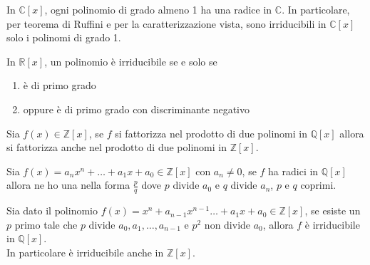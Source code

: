\begin{teorema}
	In $\mathbb{C}[x]$, ogni polinomio di grado almeno 1 ha una radice in $\mathbb{C}$. In particolare, per teorema di Ruffini e per la caratterizzazione vista, sono irriducibili in $\mathbb{C}[x]$ solo i polinomi di grado 1.
\end{teorema}
\begin{teorema}
	In $\mathbb{R}[x]$, un polinomio è irriducibile se e solo se
	\begin{enumerate}
		\item è di primo grado
		\item oppure è di primo grado con discriminante negativo
	\end{enumerate}
\end{teorema}
\begin{teorema}[di Gauss]
	\label{gauss_pol}
	Sia $f(x)\in\mathbb{Z}[x]$, se $f$ si fattorizza nel prodotto di due polinomi in $\mathbb{Q}[x]$ allora si fattorizza anche nel prodotto di due polinomi in $\mathbb{Z}[x]$.
\end{teorema}
\begin{teorema}
	Sia $f(x)=a_nx^n+\dots+a_1x+a_0\in\mathbb{Z}[x]$ con $a_n\neq0$, se $f$ ha radici in $\mathbb{Q}[x]$ allora ne ho una nella forma $\frac{p}{q}$ dove $p$ divide $a_0$ e $q$ divide $a_n$, $p$ e $q$ coprimi.
\end{teorema}
\begin{teorema}
	Sia dato il polinomio $f(x)= x^n+ a_{n-1}x^{n-1}\dots+a_1x+a_0\in\mathbb{Z}[x]$, se esiste un $p$ primo tale che $p$ divide $a_0,a_1,\dots,a_{n-1}$ e $p^2$ non divide $a_0$, allora $f$ è irriducibile in $\mathbb{Q}[x]$. \\ In particolare è irriducibile anche in $\mathbb{Z}[x]$.
\end{teorema}
